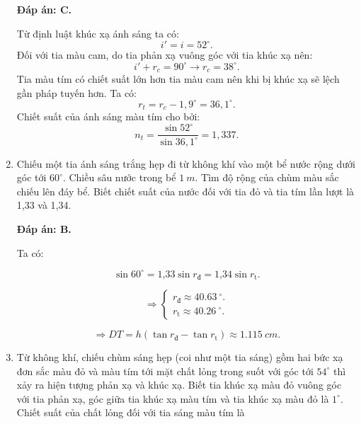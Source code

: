 \begin{enumerate}[label=\bfseries Câu \arabic*:]
	\loigiai
	{		\textbf{Đáp án: C.}
		
		Từ định luật khúc xạ ánh sáng ta có:
		$$
		i' = i = 52^\circ.
		$$
		Đối với tia màu cam, do tia phản xạ vuông góc với tia khúc xạ nên:
		$$
		i' + r_{c} = 90^\circ \rightarrow r_{c} = 38^\circ.
		$$
		Tia màu tím có chiết suất lớn hơn tia màu cam nên khi bị khúc xạ sẽ lệch gần pháp tuyến hơn. Ta có:
		$$
		r_{t} = r_{c} - 1,9^\circ = 36,1^\circ.
		$$
		Chiết suất của ánh sáng màu tím cho bởi:
		$$
		n_{t} = \dfrac{\sin{52^\circ}}{\sin{36,1^\circ}} = 1,337.
		$$
		
	}
		\item {} 
	\cauhoi
	{
		Chiếu một tia ánh sáng trắng hẹp đi từ không khí vào một bể nước rộng dưới góc tới $60^\circ$. Chiều sâu nước trong bể $\SI{1}{m}$. Tìm độ rộng của chùm màu sắc chiếu lên đáy bể. Biết chiết suất của nước đối với tia đỏ và tia tím lần lượt là 1,33 và 1,34.
		
	}
	
	\loigiai
	{		\textbf{Đáp án: B.}
		
		Ta có:
		
		$$\sin 60^\circ = \text{1,33} \sin r_\text{đ} = \text{1,34} \sin r_\text{t}.$$
		
		$$\Rightarrow 
		\begin{cases}
			r_\text{đ} \approx \SI{40,63}{^\circ}. \\
			r_\text{t} \approx \SI{40,26}{^\circ}.
		\end{cases}
		$$
		
		$$\Rightarrow DT = h(\tan r_\text{đ} - \tan r_\text{t}) \approx \SI{1,115}{cm}.$$
	}
		\item {} 
	\cauhoi
	{
		Từ không khí, chiếu chùm sáng hẹp (coi như một tia sáng) gồm hai bức xạ đơn sắc màu đỏ và màu tím tới mặt chất lỏng trong suốt với góc tới $54^\circ$ thì xảy ra hiện tượng phản xạ và khúc xạ. Biết tia khúc xạ màu đỏ vuông góc với tia phản xạ, góc giữa tia khúc xạ màu tím và tia khúc xạ màu đỏ là $1^\circ$. Chiết suất của chất lỏng đối với tia sáng màu tím là
		
	}
	

\end{enumerate}
